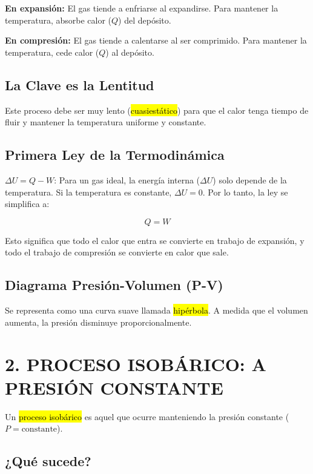 \documentclass{article}
\begin{document}
\textbf{En expansión:} El gas tiende a enfriarse al expandirse. Para mantener la temperatura, absorbe calor ($Q$) del depósito.

\textbf{En compresión:} El gas tiende a calentarse al ser comprimido. Para mantener la temperatura, cede calor ($Q$) al depósito.

\subsection*{La Clave es la Lentitud}

Este proceso debe ser muy lento (\hl{cuasiestático}) para que el calor tenga tiempo de fluir y mantener la temperatura uniforme y constante.

\subsection*{Primera Ley de la Termodinámica}

$\Delta U = Q - W$: Para un gas ideal, la energía interna ($\Delta U$) solo depende de la temperatura. Si la temperatura es constante, $\Delta U = 0$. Por lo tanto, la ley se simplifica a:

$$Q = W$$

Esto significa que todo el calor que entra se convierte en trabajo de expansión, y todo el trabajo de compresión se convierte en calor que sale.

\subsection*{Diagrama Presión-Volumen (P-V)}

Se representa como una curva suave llamada \hl{hipérbola}. A medida que el volumen aumenta, la presión disminuye proporcionalmente.

\vspace{5mm}

\section*{2. PROCESO ISOBÁRICO: A PRESIÓN CONSTANTE}

Un \hl{proceso isobárico} es aquel que ocurre manteniendo la presión constante ($P = \text{constante}$).

\subsection*{¿Qué sucede?}
\end{document}
